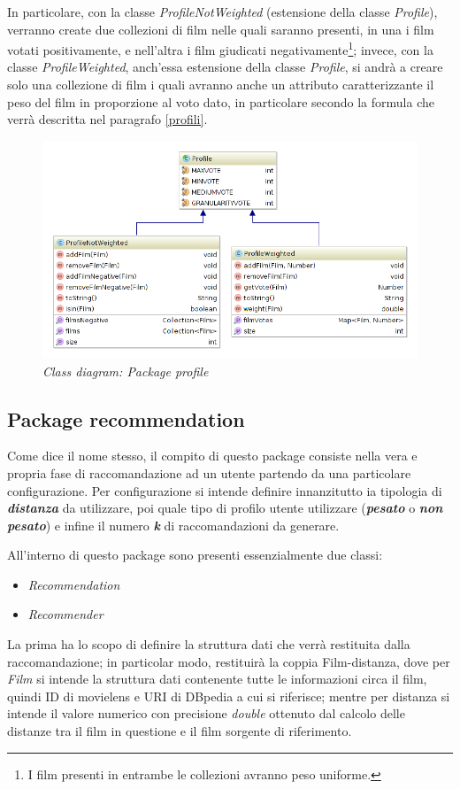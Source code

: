 In particolare, con la classe \emph{ProfileNotWeighted} (estensione della classe \emph{Profile}), verranno create due collezioni di film nelle quali saranno presenti, in una i film votati positivamente, e nell'altra i film giudicati negativamente\footnote{I film presenti in entrambe le collezioni avranno peso uniforme.}; invece, con la classe \emph{ProfileWeighted}, anch'essa estensione della classe \emph{Profile}, si andrà a creare solo una collezione di film i quali avranno anche un attributo caratterizzante il peso del film in proporzione al voto dato, in particolare secondo la formula che verrà descritta nel paragrafo \ref{profili}. 
\begin{figure}[H]
	\includegraphics[width=\textwidth]{./images/Diagrams/profile.png}
	\caption{\emph{Class diagram: Package profile}}
\end{figure}

\subsection{Package recommendation}
Come dice il nome stesso, il compito di questo package consiste nella vera e propria fase di raccomandazione ad un utente partendo da una particolare configurazione. Per configurazione si intende definire innanzitutto ia tipologia di \emph{\textbf{distanza}} da utilizzare, poi quale tipo di profilo utente utilizzare (\emph{\textbf{pesato}} o \emph{\textbf{non pesato}}) e infine il numero \emph{\textbf{k}} di raccomandazioni da generare.

All'interno di questo package sono presenti essenzialmente due classi:
\begin{itemize}
\item \emph{Recommendation} 
\item \emph{Recommender}
\end{itemize} 
La prima ha lo scopo di definire la struttura dati che verrà restituita dalla raccomandazione; in particolar modo, restituirà la coppia Film-distanza, dove per \emph{Film} si intende la struttura dati contenente tutte le informazioni circa il film, quindi ID di movielens e URI di DBpedia a cui si riferisce; mentre per distanza si intende il valore numerico con precisione \emph{double} ottenuto dal calcolo delle distanze tra il film in questione e il film sorgente di riferimento.

